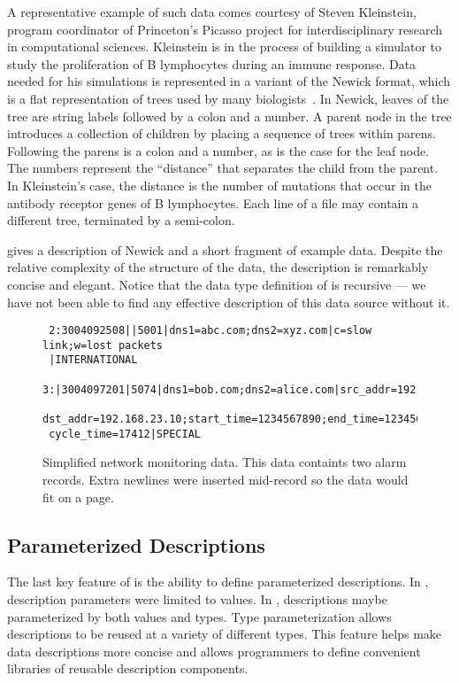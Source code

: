 A representative example of such data comes courtesy of Steven
Kleinstein, program coordinator of Princeton's Picasso project for
interdisciplinary research in computational sciences.  Kleinstein is
in the process of building a simulator to study the
proliferation of B lymphocytes during an immune response.  Data
needed for his simulations is represented in a variant of the
Newick format, which is a flat
representation of trees used by 
many biologists~\cite{newick}.  In Newick, 
leaves of the tree are string labels followed by a colon and a number.
A parent node in the tree introduces a collection of children by
placing a sequence of trees within parens.  Following the parens is a
colon and a number, as is the case for the leaf node.
The numbers represent the ``distance'' 
that separates the child from the parent.  In
Kleinstein's case, the distance is the number of mutations that occur
in the antibody receptor genes of B lymphocytes.   Each line
of a file may contain a different tree, terminated by a semi-colon.

 gives a description of Newick and a short fragment 
of example data.  Despite the relative complexity of the structure of the data,
the description is remarkably concise and elegant.  Notice that the data type
definition of  is recursive --- we have not been able to find any
effective description of this data source without it.

\begin{figure}
  \centering
  \small
\begin{verbatim}
 2:3004092508||5001|dns1=abc.com;dns2=xyz.com|c=slow link;w=lost packets
 |INTERNATIONAL
 3:|3004097201|5074|dns1=bob.com;dns2=alice.com|src_addr=192.168.0.10;
 dst_addr=192.168.23.10;start_time=1234567890;end_time=1234568000;
 cycle_time=17412|SPECIAL
\end{verbatim}  
  \caption{Simplified network monitoring data.  This 
data containts two alarm records.  Extra newlines 
were inserted mid-record so the data would fit on a page.}
  \label{fig:darkstar-records}
\end{figure}

\subsection{Parameterized Descriptions}

The last key feature of \datatype{} is the ability to define
parameterized descriptions.  In \pads, description parameters
were limited to values.  In \datatype, descriptions
maybe parameterized by both values and types.  Type parameterization
allows descriptions to be
reused at a variety of different types.  This feature 
helps make data descriptions
more concise and allows programmers to define convenient libraries
of reusable description components.


